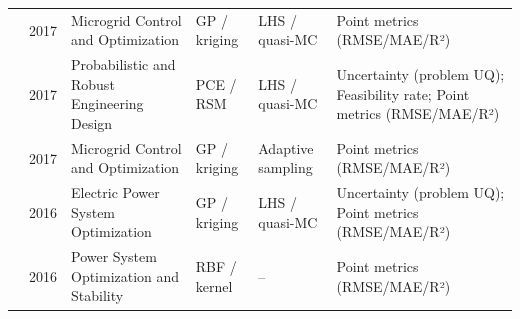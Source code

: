 \begin{longtable}{@{}p{} p{} p{} p{} p{} p{}@{}}
  \cite{Rigo-Mariani20171762} & 2017 & Microgrid Control and Optimization & GP / kriging & LHS / quasi-MC & Point metrics (RMSE/MAE/R²) \\
  \cite{Safta20172535} & 2017 & Probabilistic and Robust Engineering Design & PCE / RSM & LHS / quasi-MC & Uncertainty (problem UQ); Feasibility rate; Point metrics (RMSE/MAE/R²) \\
  \cite{Wang2017} & 2017 & Microgrid Control and Optimization & GP / kriging & Adaptive sampling & Point metrics (RMSE/MAE/R²) \\
  \cite{Lawson201647} & 2016 & Electric Power System Optimization & GP / kriging & LHS / quasi-MC & Uncertainty (problem UQ); Point metrics (RMSE/MAE/R²) \\
  \cite{Mahapatra20161921} & 2016 & Power System Optimization and Stability & RBF / kernel & -- & Point metrics (RMSE/MAE/R²) \\
\end{longtable}
